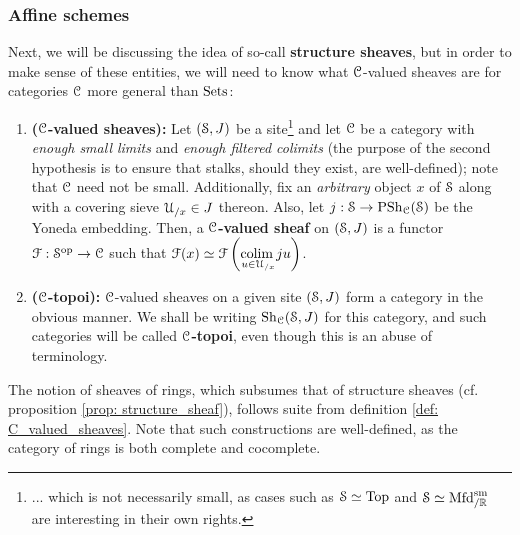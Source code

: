        \subsubsection{Affine schemes}
            Next, we will be discussing the idea of so-call \textbf{structure sheaves}, but in order to make sense of these entities, we will need to know what $\C$-valued sheaves are for categories $\C$ more general than $\Sets$:
            \begin{definition} \label{def: C_valued_sheaves}
                \noindent
                \begin{enumerate}
                    \item \textbf{($\C$-valued sheaves):} Let $(\S, J)$ be a site\footnote{... which is not necessarily small, as cases such as $\S \cong \Top$ and $\S \cong \Mfd^{\smooth}_{/\R}$ are interesting in their own rights.} and let $\C$ be a category with \textit{enough small limits} and \textit{enough filtered colimits} (the purpose of the second hypothesis is to ensure that stalks, should they exist, are well-defined); note that $\C$ need not be small. Additionally, fix an \textit{arbitrary} object $x$ of $\S$ along with a covering sieve $\calU_{/x} \in J$ thereon. Also, let $j: \S \to \Psh_{\C}(\S)$ be the Yoneda embedding. Then, a \textbf{$\C$-valued sheaf} on $(\S, J)$ is a functor $\calF: \S^{\op} \to \C$ such that $\calF(x) \cong \calF\left( \underset{u \in \calU_{/x}}{\colim} ju \right)$.
                    \item \textbf{($\C$-topoi):} $\C$-valued sheaves on a given site $(\S, J)$ form a category in the obvious manner. We shall be writing $\Sh_{\C}(\S, J)$ for this category, and such categories will be called \textbf{$\C$-topoi}, even though this is an abuse of terminology.
                \end{enumerate}
            \end{definition}
            \begin{example}
                The notion of sheaves of rings, which subsumes that of structure sheaves (cf. proposition \ref{prop: structure_sheaf}), follows suite from definition \ref{def: C_valued_sheaves}. Note that such constructions are well-defined, as the category of rings is both complete and cocomplete.
            \end{example}
            
